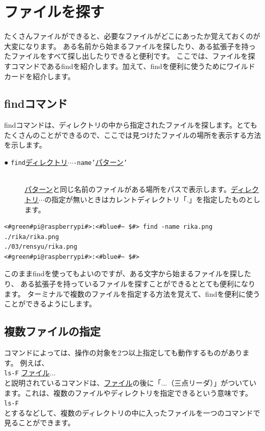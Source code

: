 \documentclass[text03.tex]{subfiles}
\begin{document}
\newpage
\section{ファイルを探す}
たくさんファイルができると、必要なファイルがどこにあったか覚えておくのが大変になります。
ある名前から始まるファイルを探したり、ある拡張子を持ったファイルをすべて探し出したりできると便利です。
ここでは、ファイルを探すコマンドであるfindを紹介します。加えて、findを便利に使うためにワイルドカードを紹介します。

\subsection{findコマンド}
findコマンドは、ディレクトリの中から指定されたファイルを探します。とてもたくさんのことができるので、ここでは見つけたファイルの場所を表示する方法を示します。

\begin{description}
    \item[● \texttt{find}\textvisiblespace \underline{ディレクトリ}$\cdots$\textvisiblespace \texttt{-name}\textvisiblespace \texttt{'}\underline{パターン}\texttt{'} ]\mbox{}\\ 
    \underline{パターン}と同じ名前のファイルがある場所をパスで表示します。\underline{ディレクトリ}$\cdots$の指定が無いときはカレントディレクトリ「.」を指定したものとします。
\end{description}

\begin{lstlisting}[caption=ワイルドカードの使い方, label=wildcard]
<#green#pi@raspberrypi#>:<#blue#~ $#> find -name rika.png
./rika/rika.png
./03/rensyu/rika.png
<#green#pi@raspberrypi#>:<#blue#~ $#>
\end{lstlisting}

このままfindを使ってもよいのですが、ある文字から始まるファイルを探したり、
ある拡張子を持っているファイルを探すことができるととても便利になります。
ターミナルで複数のファイルを指定する方法を覚えて、findを便利に使うことができるようにします。

\subsection{複数ファイルの指定}
コマンドによっては、操作の対象を2つ以上指定しても動作するものがあります。
例えば、\\
\texttt{ls}\textvisiblespace \texttt{-F} \underline{ファイル}$\ldots$\\
と説明されているコマンドは、\underline{ファイル}の後に「$\ldots$（三点リーダ）」がついています。これは、複数のファイルやディレクトリを指定できるという意味です。\\
\texttt{ls}\textvisiblespace \texttt{-F} \\
とするなどして、複数のディレクトリの中に入ったファイルを一つのコマンドで見ることができます。
\end{document}
